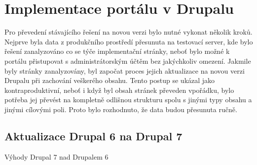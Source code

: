 \chapter{Implementace portálu v Drupalu}
\label{chap:implementace-drupal}

Pro převedení stávajícího řešení na novou verzi bylo nutné vykonat několik kroků. Nejprve byla data z produkčního prostředí přesunuta na testovací server, kde bylo řešení zanalyzováno co se týče implementační stránky, neboť bylo možné k portálu přistupovat s administrátorským účtěm bez jakýchkoliv omezení. Jakmile byly stránky zanalyzovány, byl započat proces jejich aktualizace na novou verzi Drupalu při zachování veškerého obsahu. Tento postup se ukázal jako kontraproduktivní, neboť i když byl obsah stránek převeden vpořádku, bylo potřeba jej převést na kompletně odlišnou strukturu spolu s jinými typy obsahu a jinými cílovými poli. Proto bylo rozhodnuto, že data budou přesunuta ručně.

\section{Aktualizace Drupal 6 na Drupal 7}
Výhody Drupal 7 nad Drupalem 6

